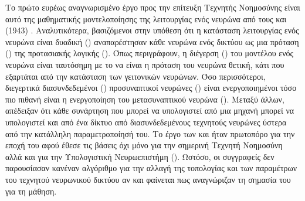 Το πρώτο ευρέως αναγνωρισμένο έργο προς την επίτευξη Τεχνητής Νοημοσύνης είναι αυτό της μαθηματικής μοντελοποίησης της λειτουργίας ενός νευρώνα από τους  και  (1943) \cite{mcculloch1943logical}. Αναλυτικότερα, βασιζόμενοι στην υπόθεση ότι η κατάσταση λειτουργίας ενός νευρώνα είναι δυαδική () αναπαρέστησαν κάθε νευρώνα ενός δικτύου ως μια πρόταση () της προτασιακής λογικής (). Όπως περιγράφουν, η διέγερση () του μοντέλου ενός νευρώνα είναι ταυτόσημη με το να είναι η πρόταση του νευρώνα θετική, κάτι που εξαρτάται από την κατάσταση των γειτονικών νευρώνων. Όσο περισσότεροι, διεγερτικά διασυνδεδεμένοι () προσυναπτικοί νευρώνες () είναι ενεργοποιημένοι τόσο πιο πιθανή είναι η ενεργοποίηση του μετασυναπτικού νευρώνα (). Μεταξύ άλλων, απέδειξαν ότι κάθε συνάρτηση που μπορεί να υπολογιστεί από μια μηχανή  μπορεί να υπολογιστεί και από ένα δίκτυο από διασυνδεδεμένους τεχνητούς νευρώνες ύστερα από την κατάλληλη παραμετροποίησή του. Το έργο των  και  ήταν πρωτοπόρο για την εποχή του αφού έθεσε τις βάσεις όχι μόνο για την σημερινή Τεχνητή Νοημοσύνη αλλά και για την Υπολογιστική Νευρωεπιστήμη (). Ωστόσο, οι συγγραφείς δεν παρουσίασαν κανέναν αλγόριθμο για την αλλαγή της τοπολογίας και των παραμέτρων του τεχνητού νευρωνικού δικτύου αν και φαίνεται πως αναγνώριζαν τη σημασία του για τη μάθηση. 
\par

